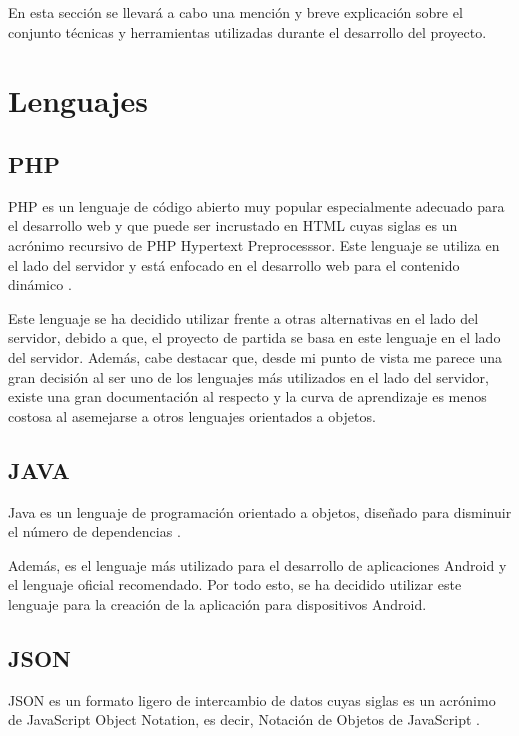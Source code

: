 
En esta sección se llevará a cabo una mención y breve explicación sobre el conjunto técnicas y herramientas utilizadas durante el desarrollo del proyecto.

\section{Lenguajes}

\subsection{PHP}

PHP es un lenguaje de código abierto muy popular especialmente adecuado para el desarrollo web y que puede ser incrustado en HTML \cite{wiki:php} cuyas siglas es un acrónimo recursivo de PHP Hypertext Preprocesssor. Este lenguaje se utiliza en el lado del servidor y está enfocado en el desarrollo web para el contenido dinámico \cite{wiki:php2}.

Este lenguaje se ha decidido utilizar frente a otras alternativas en el lado del servidor, debido a que, el proyecto de partida se basa en este lenguaje en el lado del servidor. Además, cabe destacar que, desde mi punto de vista me parece una gran decisión al ser uno de los lenguajes más utilizados en el lado del servidor, existe una gran documentación al respecto y la curva de aprendizaje es menos costosa al asemejarse a otros lenguajes orientados a objetos.

\subsection{JAVA}

Java es un lenguaje de programación orientado a objetos, diseñado para disminuir el número de dependencias \cite{wiki:java}.

Además, es el lenguaje más utilizado para el desarrollo de aplicaciones Android y el lenguaje oficial recomendado. Por todo esto, se ha decidido utilizar este lenguaje para la creación de la aplicación para dispositivos Android.

\subsection{JSON}\label{json}

JSON es un formato ligero de intercambio de datos cuyas siglas es un acrónimo de JavaScript Object Notation, es decir, Notación de Objetos de JavaScript \cite{wiki:json}. 

